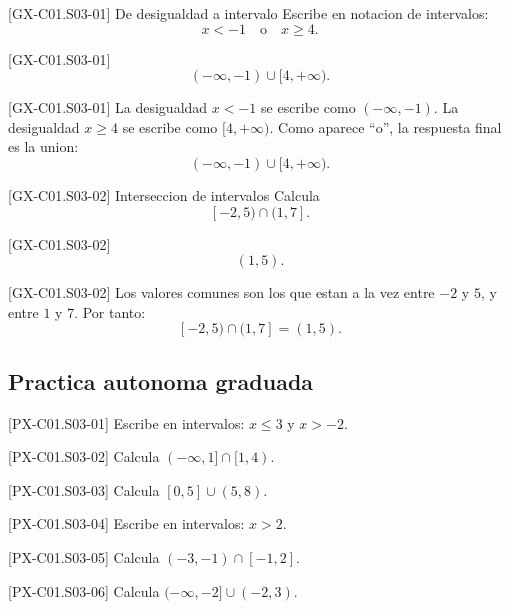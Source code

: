 \begin{guidedexercise}{[GX-C01.S03-01] De desigualdad a intervalo}
Escribe en notacion de intervalos:
\[
x<-1 \quad \text{o} \quad x\ge 4.
\]
\end{guidedexercise}

\begin{shortanswer}{[GX-C01.S03-01]}
\[
(-\infty,-1)\cup [4,+\infty).
\]
\end{shortanswer}

\begin{fullsolution}{[GX-C01.S03-01]}
La desigualdad \(x<-1\) se escribe como \((-\infty,-1)\). La desigualdad \(x\ge 4\) se escribe
como \([4,+\infty)\). Como aparece ``o'', la respuesta final es la union:
\[
(-\infty,-1)\cup [4,+\infty).
\]
\end{fullsolution}

\begin{guidedexercise}{[GX-C01.S03-02] Interseccion de intervalos}
Calcula
\[
[-2,5)\cap (1,7].
\]
\end{guidedexercise}

\begin{shortanswer}{[GX-C01.S03-02]}
\[
(1,5).
\]
\end{shortanswer}

\begin{fullsolution}{[GX-C01.S03-02]}
Los valores comunes son los que estan a la vez entre \(-2\) y \(5\), y entre \(1\) y \(7\).
Por tanto:
\[
[-2,5)\cap (1,7]=(1,5).
\]
\end{fullsolution}

\subsection*{Practica autonoma graduada}
\begin{exercise}{[PX-C01.S03-01] Escribe en intervalos: \(x\le 3\) y \(x>-2\).}
\end{exercise}
\begin{exercise}{[PX-C01.S03-02] Calcula \((-\infty,1]\cap [1,4)\).}
\end{exercise}
\begin{exercise}{[PX-C01.S03-03] Calcula \([0,5]\cup (5,8)\).}
\end{exercise}
\begin{exercise}{[PX-C01.S03-04] Escribe en intervalos: \(x>2\).}
\end{exercise}
\begin{exercise}{[PX-C01.S03-05] Calcula \((-3,-1)\cap [-1,2]\).}
\end{exercise}
\begin{exercise}{[PX-C01.S03-06] Calcula \((-\infty,-2]\cup (-2,3)\).}
\end{exercise}

